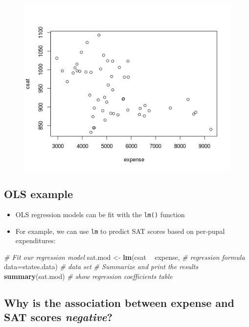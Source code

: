 \documentclass[]{book}
\newenvironment{Shaded}{\begin{snugshade}}{\end{snugshade}}
\newcommand{\KeywordTok}[1]{\textcolor[rgb]{0.13,0.29,0.53}{\textbf{#1}}}
\newcommand{\DataTypeTok}[1]{\textcolor[rgb]{0.13,0.29,0.53}{#1}}
\newcommand{\StringTok}[1]{\textcolor[rgb]{0.31,0.60,0.02}{#1}}
\newcommand{\CommentTok}[1]{\textcolor[rgb]{0.56,0.35,0.01}{\textit{#1}}}
\newcommand{\OperatorTok}[1]{\textcolor[rgb]{0.81,0.36,0.00}{\textbf{#1}}}
\newcommand{\NormalTok}[1]{#1}
\providecommand{\tightlist}{%
  \setlength{\itemsep}{0pt}\setlength{\parskip}{0pt}}
\begin{document}
\begin{figure}
\centering
\includegraphics{R/Rmodels/images/statesCorr1.png}
\caption{}
\end{figure}

\subsection{OLS example}\label{ols-example}

\begin{itemize}
\tightlist
\item
  OLS regression models can be fit with the \texttt{lm()} function
\item
  For example, we can use \texttt{lm} to predict SAT scores based on
  per-pupal expenditures:
\end{itemize}

\begin{Shaded}
\begin{Highlighting}[]
  \CommentTok{# Fit our regression model}
\NormalTok{  sat.mod <-}\StringTok{ }\KeywordTok{lm}\NormalTok{(csat }\OperatorTok{~}\StringTok{ }\NormalTok{expense, }\CommentTok{# regression formula}
                \DataTypeTok{data=}\NormalTok{states.data) }\CommentTok{# data set}
  \CommentTok{# Summarize and print the results}
  \KeywordTok{summary}\NormalTok{(sat.mod) }\CommentTok{# show regression coefficients table}
\end{Highlighting}
\end{Shaded}

\subsection{\texorpdfstring{Why is the association between expense and
SAT scores
\emph{negative}?}{Why is the association between expense and SAT scores negative?}}\label{why-is-the-association-between-expense-and-sat-scores-negative}
\end{document}
